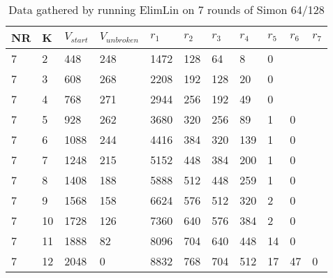 \begin{table}[h!]
	\centering
	\caption{Data gathered by running ElimLin on 7 rounds of Simon 64/128}
	\label{tbl:fullResultsSecrypt20167R}
	\begin{tabular}{lllllllllll}
		NR & K & $V_{start}$ & $V_{unbroken}$ & $r_1$   & $r_2$  & $r_3$  & $r_4$ & $r_5$ & $r_6$ & $r_7$ \\ \hline
		7  & 2 & 448    & 248       & 1472 & 128 & 64  & 8  & 0  &    &    \\
		7  & 3 & 608    & 268       & 2208 & 192 & 128 & 20 & 0  &    &    \\
		7  & 4 & 768    & 271       & 2944 & 256 & 192 & 49 & 0  &    &   \\
		7  & 5 & 928    & 262       & 3680 & 320 & 256  & 89  & 1  &   0 &    \\
		7  & 6 & 1088    & 244       & 4416 & 384 & 320 & 139 & 1  &   0 &    \\
		7  & 7 & 1248   & 215       & 5152 & 448 & 384 & 200 & 1  &   0 &   \\
		7  & 8 & 1408    & 188       & 5888 & 512 & 448  & 259  & 1 &   0 &    \\
		7  & 9 & 1568    & 158       & 6624 & 576 & 512 & 320 & 2  &  0  &    \\
		7  & 10 & 1728    & 126       & 7360 & 640 & 576 & 384 & 2  & 0   &   \\
		7  & 11 & 1888    & 82       & 8096 & 704 & 640  & 448  & 14  &  0  &    \\
		7  & 12 & 2048    & 0       & 8832 & 768 & 704 & 512 & 17  & 47   & 0    
								
	\end{tabular}
\end{table}

